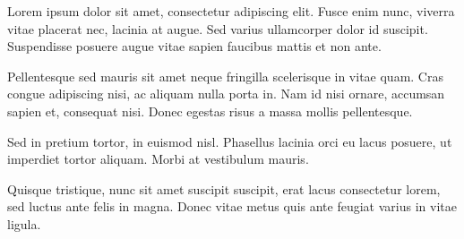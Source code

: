 \begin{acknowledgments}
Lorem ipsum dolor sit amet, consectetur adipiscing elit. Fusce enim nunc,
viverra vitae placerat nec, lacinia at augue. Sed varius ullamcorper dolor
id suscipit. Suspendisse posuere augue vitae sapien faucibus mattis et non
ante.

Pellentesque sed mauris sit amet neque fringilla scelerisque in vitae
quam. Cras congue adipiscing nisi, ac aliquam nulla porta in. Nam id nisi
ornare, accumsan sapien et, consequat nisi. Donec egestas risus a massa
mollis pellentesque.

Sed in pretium tortor, in euismod nisl. Phasellus
lacinia orci eu lacus posuere, ut imperdiet tortor aliquam. Morbi at
vestibulum mauris.

Quisque tristique, nunc sit amet suscipit suscipit, erat
lacus consectetur lorem, sed luctus ante felis in magna. Donec vitae metus
quis ante feugiat varius in vitae ligula.
\end{acknowledgments}


\tableofcontents
\listoffigures
\listoftables
\mainmatter

\pagestyle{fancy}
